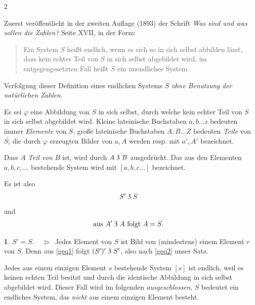 \documentclass[leqno,hidelinks,10pt]{article}
\theoremstyle{definition}
\newtheorem{satz}{\protect\satzname}
\newcommand{\satzname}{}
\renewcommand{\satzname}{\hspace{-4pt}.\ Satz}%
\renewcommand{\satzname}{\hspace{-4pt}.\ Theorem}%
\newcommand\Beweis{\medskip \newline $ \phantom{'.'} \rhd \ $}%
\newcommand\TeilVon{\mathrel{\raisebox{0.45ex}{$\mathfrak{3}$}}}
\begin{document}
\begin{paracol}{2} %
    \begin{leftcolumn}

\noindent Zuerst veröffentlicht in der zweiten Auflage (1893) der Schrift
\textit{\glqq Was sind und was sollen die Zahlen?\grqq{}} Seite XVII, in der Form:%

\begin{quote}
Ein System $S$ heißt endlich, wenn es sich so in sich selbst abbilden
lässt, dass kein echter Teil von $S$ in sich selbst abgebildet
wird; im entgegengesetzten Fall heißt $S$ ein unendliches System.
\end{quote}

Verfolgung dieser Definition eines endlichen Systems $S$
\emph{ohne Benutzung der natürlichen Zahlen}.

Es sei $\varphi$ eine Abbildung von $S$ in sich selbst, durch welche kein echter
Teil von $S$ in sich selbst abgebildet wird.
Kleine lateinische Buchstaben  $a, b \ldots z$ bedeuten immer \emph{Elemente} von
$S$, große lateinische Buchstaben $A, B \ldots Z$ bedeuten \emph{Teile} von $S$;
die durch $\varphi$ erzeugten Bilder von $a, A$ werden resp. mit $a', A'$ bezeichnet.

Dass $A$ \emph{Teil von} $B$ ist, wird durch $A \TeilVon B$ ausgedrückt. Das aus den
Elementen $a, b, c, \ldots $ bestehende System wird mit $[a, b, c \ldots]$ bezeichnet.

Es ist also
\begin{equation}\label{geq1}
                S' \TeilVon S
\end{equation}
und%
\begin{equation}\label{geq2}
        \text{aus } A' \TeilVon A \text{ folgt } A = S.
\end{equation}

\begin{satz}\label{gthm1}$S' = S$.
\Beweis
Jedes Element von $S$ ist Bild von (mindestens) einem Element $r$ von $S$. Denn
aus \eqref{geq1} folgt $(S')' \TeilVon S'$, also nach \eqref{geq2} unser Satz.
\end{satz}
Jedes aus einem einzigen Element $s$ bestehende System $[s]$ ist endlich, weil
es keinen echten Teil besitzt und durch die identische Abbildung in sich selbst
abgebildet wird. Dieser Fall wird im folgenden \emph{ausgeschlossen}, $S$ bedeutet
ein endliches System, das \emph{nicht} aus einem einzigen Element besteht.


\end{leftcolumn}
\end{paracol}
\end{document}
